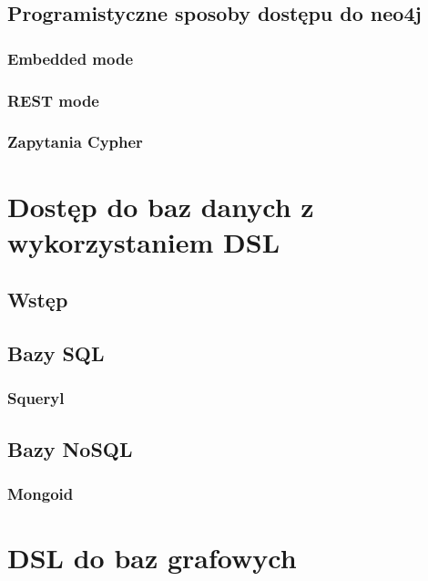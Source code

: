 \documentclass[brudnopis]{xmgr}
\begin{document}


\section{Programistyczne sposoby dostępu do neo4j}

\subsection{Embedded mode}

\subsection{REST mode}

\subsection{Zapytania Cypher}

\chapter{Dostęp do baz danych z wykorzystaniem DSL}

\section{Wstęp}

\section{Bazy SQL}

\subsection{Squeryl}

\section{Bazy NoSQL}

\subsection{Mongoid}

\chapter{DSL do baz grafowych}
\end{document}
